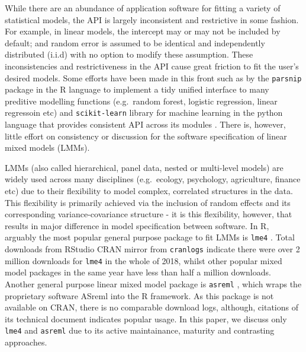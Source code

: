 \documentclass[runningheads]{llncs}
\begin{document}
While there are an abundance of application software for fitting a variety of statistical models, the API is largely inconsistent and restrictive in some fashion. For example, in linear models, the intercept may or may not be included by default; and random error is assumed to be identical and independently distributed (i.i.d) with no option to modify these assumption. These inconsistencies and restrictiveness in the API cause great friction to fit the user's desired models. Some efforts have been made in this front such as by the \texttt{parsnip} package \autocite{Kuhn2018} in the R language \autocite{R2018} to implement a tidy unified interface to many preditive modelling functions (e.g.~random forest, logistic regression, linear regressoin etc) and \texttt{scikit-learn} library \autocite{scikit-learn} for machine learning in the python language \autocite{van1995python} that provides consistent API across its modules \autocite{sklearn_api}. There is, however, little effort on consistency or discussion for the software specification of linear mixed models (LMMs).

LMMs (also called hierarchical, panel data, nested or multi-level models) are widely used across many disciplines (e.g.~ecology, psychology, agriculture, finance etc) due to their flexibility to model complex, correlated structures in the data. This flexibility is primarily achieved via the inclusion of random effects and its corresponding variance-covariance structure - it is this flexibility, however, that results in major difference in model specification between software. In R, arguably the most popular general purpose package to fit LMMs is \texttt{lme4} \autocite{Bates2015}. Total downloads from RStudio CRAN mirror from \texttt{cranlogs} \autocite{cranlog} indicate there were over 2 million downloads for \texttt{lme4} in the whole of 2018, whilst other popular mixed model packages \autocites[e.g. \texttt{nlme},][]{nlme}[\texttt{rstan},][]{rstan}[\texttt{brms},][]{brmsjss}{brmsr} in the same year have less than half a million downloads. Another general purpose linear mixed model package is \texttt{asreml} \autocite{Butler2009}, which wraps the proprietary software ASreml \autocite{Gilmour2009} into the R framework. As this package is not available on CRAN, there is no comparable download logs, although, citations of its technical document indicates popular usage. In this paper, we discuss only \texttt{lme4} and \texttt{asreml} due to its active maintainance, maturity and contrasting approaches.
\end{document}
